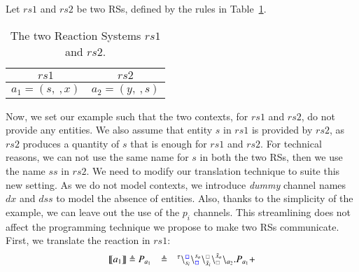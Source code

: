 \begin{example}
\label{ex:twoRS}
Let  $rs1$ and $rs2$ be two RSs, defined by the rules in Table~\ref{tab:rules}.


\begin{table}[t]
\centering
\begin{tabular}{|c|c|}
\hline
$rs1$  & $rs2$ \\
\hline
$a_1=(s,\ , x)$ & $a_2=(y,\  ,s)$\\
\hline 
\end{tabular}
\caption{The two Reaction Systems $rs1$ and $rs2$.}
\label{tab:rules}
\end{table}
 \noindent
Now, we set our example such that the two contexts, for  $rs1$ and $rs2$, do not provide any entities.
We also assume that entity $s$ in $rs1$ is provided by $rs2$, as $rs2$ produces a quantity of $s$ that is enough for $rs1$ and $rs2$.
For technical reasons, we can not use the same name for  $s$ in both the two RSs, then we use the name $ss$ in $rs2$.
%
We need to modify our translation technique to suite this new setting. 
As we do not model contexts, we introduce  \emph{dummy} channel names $dx$ and $dss$ to model the absence of entities. Also, thanks to the simplicity of the example, we can leave out the use of the   $p_i$ channels. This streamlining does not affect the programming technique we propose to make two RSs communicate.
First, we translate the reaction in $rs1$:
\[
\begin{array}{lcl}
\llbracket a_1\rrbracket \defeq P_{a_1}&\defeq &
\startchain{\silent}\chainedlink{s_i}{{\color{blue}\noact}}\chainedlink{{\color{blue}\noact}}{s_o}\chainedlink{\tilde{x}_i}{{\color{gray}\noact}}\chainedlink{{\color{gray}\noact}}{\tilde{x}_o}\chainend{a_2}.P_{a_1} +

\end{array}\]
\end{example}
